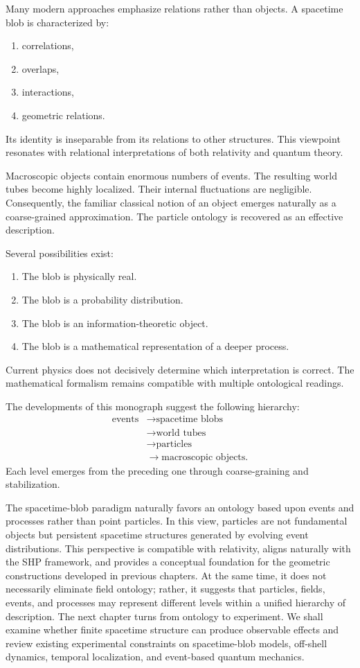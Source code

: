 Many modern approaches emphasize relations rather than objects.
A spacetime blob is characterized by:
\begin{enumerate}
\item correlations,
\item overlaps,
\item interactions,
\item geometric relations.
\end{enumerate}
Its identity is inseparable from its relations to other structures.
This viewpoint resonates with relational interpretations of both relativity and quantum theory.

Macroscopic objects contain enormous numbers of events.
The resulting world tubes become highly localized.
Their internal fluctuations are negligible.
Consequently, the familiar classical notion of an object emerges naturally as a coarse-grained approximation.
The particle ontology is recovered as an effective description.

Several possibilities exist:
\begin{enumerate}
\item The blob is physically real.
\item The blob is a probability distribution.
\item The blob is an information-theoretic object.
\item The blob is a mathematical representation of a deeper process.
\end{enumerate}
Current physics does not decisively determine which interpretation is correct.
The mathematical formalism remains compatible with multiple ontological readings.

The developments of this monograph suggest the following hierarchy:
\begin{align}
\text{events}&\rightarrow \text{spacetime blobs}\\
&\rightarrow \text{world tubes}\\
&\rightarrow \text{particles}\\
&\rightarrow \text{macroscopic objects}.
\end{align}
Each level emerges from the preceding one through coarse-graining and stabilization.

The spacetime-blob paradigm naturally favors an ontology based upon events
and processes rather than point particles. In this view, particles are not
fundamental objects but persistent spacetime structures generated by
evolving event distributions.
This perspective is compatible with relativity, aligns naturally with 
the SHP framework, and provides a conceptual foundation for the geometric
constructions developed in previous chapters. At the same time, it does not
necessarily eliminate field ontology; rather, it suggests that particles,
fields, events, and processes may represent different levels within a 
unified hierarchy of description.
The next chapter turns from ontology to experiment. We shall examine whether
finite spacetime structure can produce observable effects and review existing
experimental constraints on spacetime-blob models, off-shell dynamics,
temporal localization, and event-based quantum mechanics.


